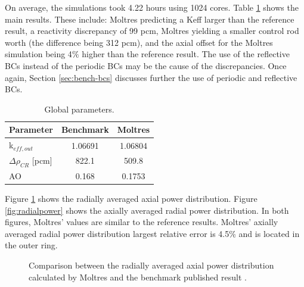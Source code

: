 On average, the simulations took 4.22 hours using 1024 cores.
Table \ref{tab:globalparam} shows the main results.
These include: Moltres predicting a \gls{Keff} larger than the reference result, a reactivity discrepancy of 99 pcm, Moltres yielding a smaller control rod worth (the difference being 312 pcm), and the axial offset for the Moltres simulation being 4$\%$ higher than the reference result.
The use of the reflective BCs instead of the periodic BCs may be the cause of the discrepancies.
Once again, Section \ref{sec:bench-bcs} discusses further the use of periodic and reflective BCs.

\begin{table}[htbp!]
  \centering
  \caption{Global parameters.}
  \begin{tabular}{lcc}
  \toprule
  Parameter 	&  Benchmark  &  Moltres    \\
  \midrule
  k$_{eff, out}$ 	&  1.06691    &  1.06804    \\
  $\Delta \rho_{CR}$ [pcm]  & 822.1 	& 509.8 \\
  AO        	&  0.168      &  0.1753     \\
  \bottomrule
  \end{tabular}
  \label{tab:globalparam}
\end{table}

Figure \ref{fig:axialpower} shows the radially averaged axial power distribution.
Figure \ref{fig:radialpower} shows the axially averaged radial power distribution.
In both figures, Moltres' values are similar to the reference results.
Moltres' axially averaged radial power distribution largest relative error is 4.5\% and is located in the outer ring.

\begin{figure}[htbp!]
	\centering
	\hfill
	\caption{Comparison between the radially averaged axial power distribution calculated by Moltres and the benchmark published result \cite{oecd_nea_coupled_2020}.}
	\label{fig:axialpower}
\end{figure}


